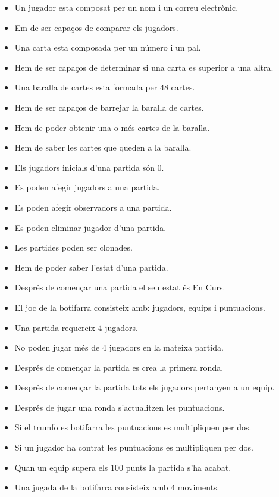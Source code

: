 \begin{itemize}
    \item{Un jugador esta composat per un nom i un correu electrònic.}
    \item{Em de ser capaços de comparar els jugadors.}
   \item{Una carta esta composada per un número i un pal.}
    \item{Hem de ser capaços de determinar si una carta es superior a una altra.}
    \item{Una baralla de cartes esta formada per 48 cartes.}
    \item{Hem de ser capaços de barrejar la baralla de cartes.}
    \item{Hem de poder obtenir una o més cartes de la baralla.}
   \item{Hem de saber les cartes que queden a la baralla.}
    \item{Els jugadors inicials d'una partida són 0.}
    \item{Es poden afegir jugadors a una partida.}
    \item{Es poden afegir observadors a una partida.}
    \item{Es poden eliminar jugador d'una partida.}
    \item{Les partides poden ser clonades.}
    \item{Hem de poder saber l'estat d'una partida.}
    \item{Després de començar una partida el seu estat és En Curs.}
    \item{El joc de la botifarra consisteix amb: jugadors, equips i puntuacions.}
    \item{Una partida requereix 4 jugadors.}
    \item{No poden jugar més de 4 jugadors en la mateixa partida.}
    \item{Després de començar la partida es crea la primera ronda.}
    \item{Després de començar la partida tots els jugadors pertanyen a un equip.}
    \item{Després de jugar una ronda s'actualitzen les puntuacions.}
    \item{Si el trumfo es botifarra les puntuacions es multipliquen per dos.}
    \item{Si un jugador ha contrat les puntuacions es multipliquen per dos.}
    \item{Quan un equip supera els 100 punts la partida s'ha acabat.}
    \item{Una jugada de la botifarra consisteix amb 4 moviments.}

\end{itemize}
